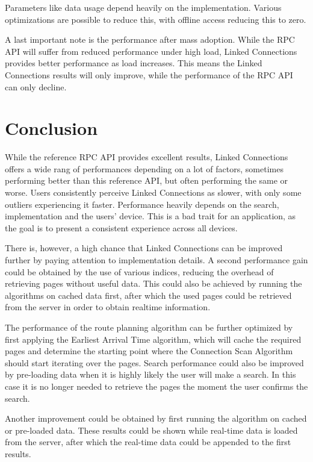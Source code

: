 \documentclass[twocolumn]{phdsymp} %
\begin{document}
Parameters like data usage depend heavily on the implementation. Various optimizations are possible to reduce this, with offline access reducing this to zero.

A last important note is the performance after mass adoption. While the RPC API will suffer from reduced performance under high load, Linked Connections provides better performance as load increases. This means the Linked Connections results will only improve, while the performance of the RPC API can only decline.
 
\section{Conclusion}
While the reference RPC API provides excellent results, Linked Connections offers a wide rang of performances depending on a lot of factors, sometimes performing better than this reference API, but often performing the same or worse. Users consistently perceive Linked Connections as slower, with only some outliers experiencing it faster. Performance heavily depends on the search, implementation and the users' device. This is a bad trait for an application, as the goal is to present a consistent experience across all devices. 

There is, however, a high chance that Linked Connections can be improved further by paying attention to implementation details. A second performance gain could be obtained by the use of various indices, reducing the overhead of retrieving pages without useful data. This could also be achieved by running the algorithms on cached data first, after which the used pages could be retrieved from the server in order to obtain realtime information. 

The performance of the route planning algorithm can be further optimized by first applying the Earliest Arrival Time algorithm, which will cache the required pages and determine the starting point where the Connection Scan Algorithm should start iterating over the pages. Search performance could also be improved by pre-loading data when it is highly likely the user will make a search. In this case it is no longer needed to retrieve the pages the moment the user confirms the search.

Another improvement could be obtained by first running the algorithm on cached or pre-loaded data. These results could be shown while real-time data is loaded from the server, after which the real-time data could be appended to the first results.
\end{document}
